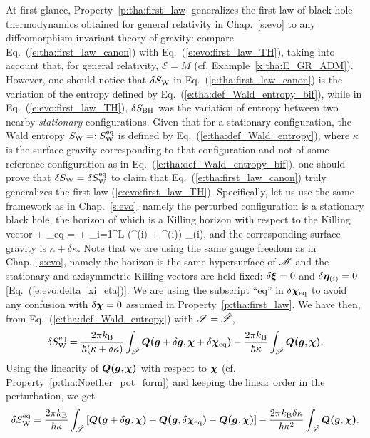 At first glance, Property~\ref{p:tha:first_law} generalizes the first law of
black hole thermodynamics obtained for general relativity in Chap.~\ref{s:evo}
to any diffeomorphism-invariant theory of gravity:
compare Eq.~(\ref{e:tha:first_law_canon}) with
Eq.~(\ref{e:evo:first_law_TH}), taking into account that, for general relativity,
$\mathcal{E} = M$ (cf. Example~\ref{x:tha:E_GR_ADM}).
However, one should
notice that $\delta S_{\rm W}$ in Eq.~(\ref{e:tha:first_law_canon}) is the variation of the entropy defined
by Eq.~(\ref{e:tha:def_Wald_entropy_bif}), while in Eq.~(\ref{e:evo:first_law_TH}),
$\delta S_{\rm BH}$ was the variation of entropy between two nearby
\emph{stationary} configurations. Given that for a stationary configuration,
the Wald entropy $S_{\rm W} =: S_{\rm W}^{\rm eq}$
is defined by Eq.~(\ref{e:tha:def_Wald_entropy}), where
$\kappa$ is the surface gravity corresponding to that configuration and not of
some reference configuration as in Eq.~(\ref{e:tha:def_Wald_entropy_bif}),
one should prove that $\delta S_{\rm W} = \delta S_{\rm W}^{\rm eq}$
to claim that Eq.~(\ref{e:tha:first_law_canon}) truly generalizes
the first law (\ref{e:evo:first_law_TH}). Specifically, let us use the
same framework as in Chap.~\ref{s:evo}, namely the perturbed configuration
is a stationary black hole, the horizon of which is a Killing horizon with
respect to the Killing vector
\be \label{e:tha:chi_delta_chi}
    \w{\chi} + \delta\w{\chi}_{\rm eq} = \w{\xi} + \sum_{i=1}^{L} (\Omega^{(i)} + \delta\Omega^{(i)}) \w{\eta}_{(i)},
\ee
and the corresponding surface gravity is $\kappa+\delta\kappa$. Note that we are using the
same gauge freedom as in Chap.~\ref{s:evo}, namely the horizon is the same
hypersurface of $\mathscr{M}$ and the stationary and axisymmetric Killing vectors are
held fixed: $\delta\bm{\xi} = 0$ and $\delta\bm{\eta}_{(i)} = 0$ [Eq.~(\ref{e:evo:delta_xi_eta})].
We are using the subscript ``eq'' in $\delta\bm{\chi}_{\rm eq}$ to avoid any confusion
with $\delta\bm{\chi} = 0$ assumed in Property~\ref{p:tha:first_law}.
We have then, from Eq.~(\ref{e:tha:def_Wald_entropy}) with $\mathscr{S} = \hat{\mathscr{S}}$,
\[
     \delta S_{\rm W}^{\rm eq} = \frac{2 \pi k_{\rm B}}{\hbar(\kappa+\delta\kappa)}
     \int_{\hat{\mathscr{S}}} \bm{Q}\textbf{(}\bm{g} + \delta\bm{g},\bm{\chi} + \delta\bm{\chi}_{\rm eq}\textbf{)}
     - \frac{2 \pi k_{\rm B}}{\hbar\kappa}
     \int_{\hat{\mathscr{S}}} \bm{Q}\textbf{(}\bm{g},\bm{\chi}\textbf{)} .
\]
Using the linearity of $\bm{Q}\textbf{(}\bm{g},\bm{\chi}\textbf{)}$ with respect to $\bm{\chi}$
(cf. Property~\ref{p:tha:Noether_pot_form}) and keeping the linear order in the
perturbation, we get
\[
     \delta S_{\rm W}^{\rm eq} = \frac{2 \pi k_{\rm B}}{\hbar\kappa} \int_{\hat{\mathscr{S}}}
    \left[  \bm{Q}\textbf{(}\bm{g} + \delta\bm{g},\bm{\chi}\textbf{)} + \bm{Q}\textbf{(}\bm{g},\delta\bm{\chi}_{\rm eq}\textbf{)}
    -  \bm{Q}\textbf{(}\bm{g},\bm{\chi}\textbf{)} \right]
    - \frac{2 \pi k_{\rm B}\delta\kappa}{\hbar\kappa^2} \int_{\hat{\mathscr{S}}} \bm{Q}\textbf{(}\bm{g},\bm{\chi}\textbf{)}  .
\]
